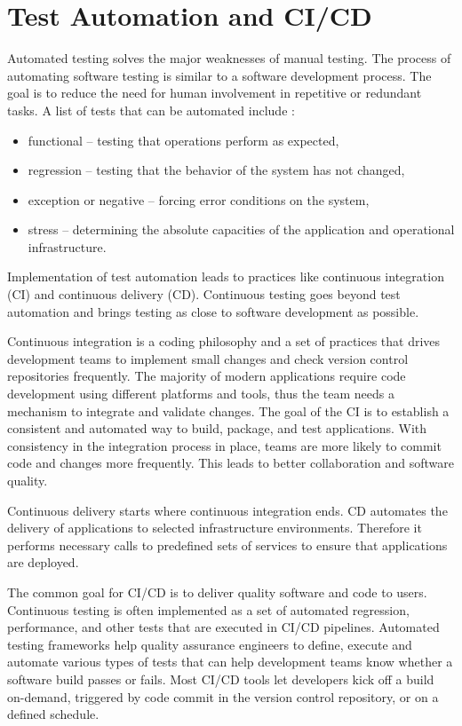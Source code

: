 \section{Test Automation and CI/CD}
Automated testing solves the major weaknesses of manual testing. The process of automating software testing is similar to a software development process. The goal is to reduce the need for human involvement in repetitive or redundant tasks. A list of tests that can be automated include \cite{ci_tests}:
\begin{itemize}
    \item functional -- testing that operations perform as expected,
    \item regression -- testing that the behavior of the system has not changed,
    \item exception or negative -- forcing error conditions on the system,
    \item stress -- determining the absolute capacities of the application and operational infrastructure.
\end{itemize}

Implementation of test automation leads to practices like continuous integration (CI) and continuous delivery (CD). Continuous testing goes beyond test automation and brings testing as close to software development as possible.

Continuous integration is a coding philosophy and a set of practices that drives development teams to implement small changes and check version control repositories frequently. The majority of modern applications require code development using different platforms and tools, thus the team needs a mechanism to integrate and validate changes. The goal of the CI is to establish a consistent and automated way to build, package, and test applications. With consistency in the integration process in place, teams are more likely to commit code and changes more frequently. This leads to better collaboration and software quality.

Continuous delivery starts where continuous integration ends. CD automates the delivery of applications to selected infrastructure environments. Therefore it performs necessary calls to predefined sets of services to ensure that applications are deployed.

The common goal for CI/CD is to deliver quality software and code to users. Continuous testing is often implemented as a set of automated regression, performance, and other tests that are executed in CI/CD pipelines. Automated testing frameworks help quality assurance engineers to define, execute and automate various types of tests that can help development teams know whether a software build passes or fails. Most CI/CD tools let developers kick off a build on-demand, triggered by code commit in the version control repository, or on a defined schedule. 


